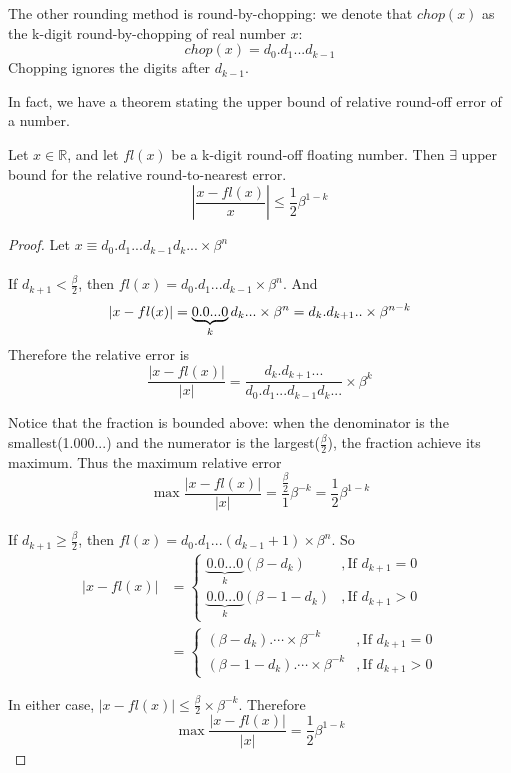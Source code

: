 	The other rounding method is round-by-chopping: we denote that $chop(x)$ as the k-digit round-by-chopping of real number $x$:
	\[ chop(x) = d_0.d_1...d_{k-1} \]
	Chopping ignores the digits after $d_{k-1}$.
	
	In fact, we have a theorem stating the upper bound of relative round-off error of a number.
	\begin{upperbound}
		Let $x\in\mathbb{R}$, and let $fl(x)$ be a k-digit round-off floating number. Then $\exists$ upper bound for the relative round-to-nearest error.
		\[\left|\frac{x-fl(x)}{x}\right|\leq \frac{1}{2}\beta^{1-k} \] 
	\end{upperbound}
	
	\begin{proof}
		Let $x\equiv d_0.d_1...d_{k-1}d_{k}...\times \beta^n$\\
		\\
		If $d_{k+1}<\frac{\beta}{2}$, then $fl(x)= d_0.d_1...d_{k-1}\times\beta^n$. And
		\[ |x-fl(x)| 
		= \underbrace{0.0...0}_{k} d_{k}...\times\beta^n\\
		=d_{k}.d_{k+1}..\times\beta^{n-k} \]
		Therefore the relative error is
		\[ \frac{|x-fl(x)|}{|x|} 
		= \frac{d_{k}.d_{k+1}...}{d_0.d_1...d_{k-1}d_{k}...}\times\beta^{k}
		\]
		
		Notice that the fraction is bounded above: when the denominator is the smallest(1.000...) and the numerator is the largest($\frac{\beta}{2}$), the fraction achieve its maximum. Thus the maximum relative error 
		\[ \max \frac{|x-fl(x)|}{|x|} = \frac{\frac{\beta}{2}}{1}\beta^{-k} 
		= \frac{1}{2}\beta^{1-k} \]
		\\
		If $d_{k+1}\geq\frac{\beta}{2}$, then $fl(x)= d_0.d_1...(d_{k-1}+1)\times\beta^n$. So
		\begin{align*}
		|x-fl(x)| &= \left\{ \begin{matrix}
		\underbrace{0.0...0}_{k}(\beta-d_k) &,\text{If } d_{k+1}=0\\
		\underbrace{0.0...0}_{k}(\beta-1-d_k) &,\text{If } d_{k+1}>0
		\end{matrix} \right. \\
		&= \left\{ \begin{matrix}
		(\beta-d_k).\cdots \times\beta^{-k} &,\text{If } d_{k+1}=0\\
		(\beta-1-d_k).\cdots\times\beta^{-k} &,\text{If } d_{k+1}>0
		\end{matrix} \right. 
		\end{align*}
		
		In either case, $|x-fl(x)|\leq \frac{\beta}{2}\times\beta^{-k}$. Therefore
		\[ \max\frac{|x-fl(x)|}{|x|} = \frac{1}{2}\beta^{1-k} \]
	\end{proof}

